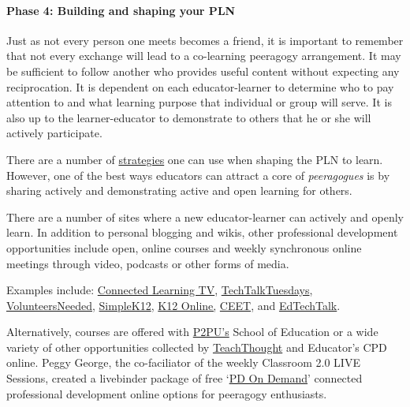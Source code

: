 \paragraph{Phase 4: Building and shaping your PLN}

Just as not every person one meets becomes a friend, it is important to
remember that not every exchange will lead to a co-learning peeragogy
arrangement. It may be sufficient to follow another who provides useful
content without expecting any reciprocation. It is dependent on each
educator-learner to determine who to pay attention to and what learning
purpose that individual or group will serve. It is also up to the
learner-educator to demonstrate to others that he or she will actively
participate.

There are a number of
\href{http://storify.com/digiphile/how-to-build-a-personal-learning-network-on-twitte}{strategies}
one can use when shaping the PLN to learn. However, one of the best ways
educators can attract a core of \emph{peeragogues} is by sharing
actively and demonstrating active and open learning for others.

There are a number of sites where a new educator-learner can actively
and openly learn. In addition to personal blogging and wikis, other
professional development opportunities include open, online courses and
weekly synchronous online meetings through video, podcasts or other
forms of media.

Examples include:
\href{http://connectedlearning.tv/howard-rheingold-social-media-and-peer-learning-mediated-pedagogy-peeragogy}{Connected
Learning TV},
\href{http://techtalktuesdays.global2.vic.edu.au/}{TechTalkTuesdays},
\href{http://learning2gether.pbworks.com/w/page/32206114/volunteersneeded}{VolunteersNeeded},
\href{http://simplek12.com/webinars}{SimpleK12},
\href{http://k12onlineconference.org/}{K12 Online,}
\href{http://www.learnnowbc.ca/educators/moodlemeets/default.aspx}{CEET},
and \href{http://edtechtalk.com/taxonomy/term/130}{EdTechTalk}.

Alternatively, courses are offered with
\href{https://p2pu.org/en/schools/school-of-ed-pilot/}{P2PU's} School of
Education or a wide variety of other opportunities collected by
\href{http://www.teachthought.com/}{TeachThought} and Educator's CPD
online. Peggy George, the co-faciliator of the weekly Classroom 2.0 LIVE
Sessions, created a livebinder package of free
`\href{http://www.google.com/url?q=http\%3A\%2F\%2Fwww.livebinders.com\%2Fplay\%2Fplay\_or\_edit\%3Fid\%3D429095\&sa=D\&sntz=1\&usg=AFQjCNHCIdRn64rPwske2vP7xrpWolb-jA}{PD
On Demand}' connected professional development online options for
peeragogy enthusiasts.

